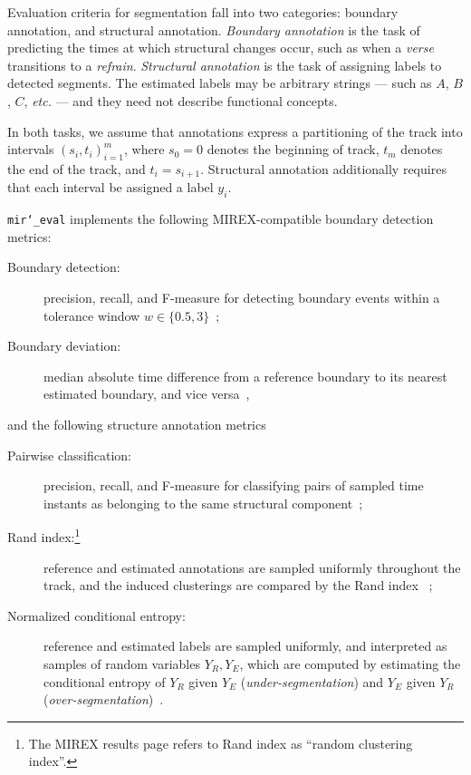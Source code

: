 \documentclass{article}
\def\etc{\emph{etc.}}
\def\mireval{\texttt{mir\char`_eval}}
\begin{document}
Evaluation criteria for segmentation fall into two categories: boundary annotation, and structural annotation.
\emph{Boundary annotation} is the task of predicting the times at which structural changes occur, such as when a \emph{verse} transitions to a \emph{refrain}.
\emph{Structural annotation} is the task of assigning labels to detected segments.  
The estimated labels may be arbitrary strings --- such as $A$, $B$, $C$, \etc{} --- and they need not describe functional concepts.

In both tasks, we assume that annotations express a partitioning of the track 
into intervals ${(s_i, t_i)}_{i=1}^m$, where $s_0=0$ denotes the beginning of track, 
$t_m$ denotes the end of the track, and $t_i = s_{i+1}$.
Structural annotation additionally requires that each interval be assigned a label $y_i$.

\mireval{} implements the following MIREX-compatible boundary detection metrics:
\begin{description}
\item[Boundary detection:] precision, recall, and F-measure for detecting boundary
events within a tolerance window $w\in \{0.5, 3\}$~\cite{turnbull2007supervised};
\item[Boundary deviation:] median absolute time difference from a reference boundary
to its nearest estimated boundary, and vice versa~\cite{turnbull2007supervised},
\end{description}
and the following structure annotation metrics
\begin{description}
\item[Pairwise classification:] precision, recall, and F-measure for classifying pairs
of sampled time instants as belonging to the same structural
component~\cite{levy2008structural};
\item[Rand index:\footnote{The MIREX results page refers to Rand index as ``random
clustering index''.}] reference and estimated annotations are sampled uniformly
throughout the track, and the induced clusterings are compared by the Rand index
~\cite{rand1971objective};
\item[Normalized conditional entropy:] reference and estimated labels are sampled
uniformly, and interpreted as samples of random variables $Y_R, Y_E$, which are
computed by estimating the conditional entropy of $Y_R$ given $Y_E$
(\emph{under-segmentation}) and $Y_E$ given $Y_R$ 
(\emph{over-segmentation})~\cite{lukashevich2008towards}.
\end{description}
\end{document}
